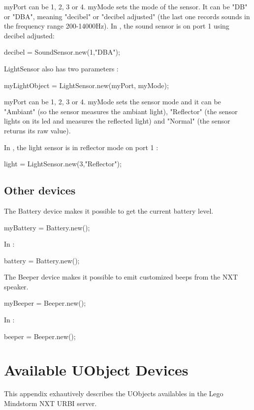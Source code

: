 myPort can be 1, 2, 3 or 4. myMode sets the mode of the sensor. It can be "DB"
or "DBA", meaning "decibel" or "decibel adjusted" (the last one records sounds
in the frequency range 200-14000Hz).
In , the sound sensor is on port 1 using decibel adjusted:
\begin{urbiunchecked}
  decibel = SoundSensor.new(1,"DBA");
\end{urbiunchecked}

LightSensor also has two parameters :
\begin{urbiunchecked}
  myLightObject = LightSensor.new(myPort, myMode);
\end{urbiunchecked}

myPort can be 1, 2, 3 or 4. myMode sets the sensor mode and it can be "Ambiant"
(so the sensor measures the ambiant light), "Reflector" (the sensor lights on
its led and measures the reflected light) and "Normal" (the sensor returns its
raw value).

In , the light sensor is in reflector mode on port 1 :
\begin{urbiunchecked}
  light = LightSensor.new(3,"Reflector");
\end{urbiunchecked}


\subsection{Other devices}
The Battery device makes it possible to get the current battery level.
\begin{urbiunchecked}
  myBattery = Battery.new();
\end{urbiunchecked}

In  :
\begin{urbiunchecked}
  battery = Battery.new();
\end{urbiunchecked}

The Beeper device makes it possible to emit customized beeps from the NXT
speaker.
\begin{urbiunchecked}
  myBeeper = Beeper.new();
\end{urbiunchecked}

In  :
\begin{urbiunchecked}
  beeper  = Beeper.new();
\end{urbiunchecked}


\section{Available UObject Devices}
\label{sec:nxt:specs}
This appendix exhautively describes the UObjects availables in the Lego
Mindstorm NXT URBI server.

